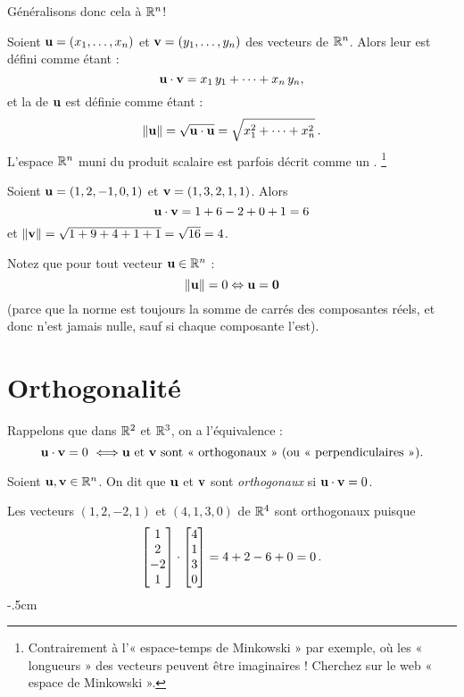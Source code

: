 Généralisons donc cela à $\mathbb{R}^n$!

\begin{definition}
Soient $\mathbf{u} = (x_1,\ldots,x_n)$ et $\mathbf{v} = (y_1,\ldots,y_n)$ des vecteurs
de $\mathbb{R}^n$.  Alors leur  est défini comme étant : 
$$
\mathbf{u} \cdot \mathbf{v} = x_1\,y_1 + \cdots + x_n\,y_n,
$$
et la  de $\mathbf{u}$ est définie comme étant :
$$
\Vert \mathbf{u} \Vert = \sqrt{\mathbf{u} \cdot \mathbf{u}} = \sqrt{x_1^2+\cdots+x_n^2}\,.
$$
L'espace $\mathbb{R}^n$  muni du produit scalaire est parfois décrit comme un .
\footnote{Contrairement à l'« espace-temps de Minkowski » par exemple, où les « longueurs » des vecteurs peuvent être imaginaires ! Cherchez sur le web « espace de Minkowski ».}
\end{definition}


\begin{myexample}
Soient $\mathbf{u} = (1,2,-1,0,1)$ et $\mathbf{v} = (1,3,2,1,1)$.  Alors
$$
\mathbf{u} \cdot \mathbf{v} = 1+6-2+0+1 = 6
$$
et
$\Vert \mathbf{v} \Vert = \sqrt{1+9+4+1+1} = \sqrt{16}=4$.
\end{myexample}

Notez que pour tout vecteur $\mathbf{u} \in \mathbb{R}^n$ :
$$
\Vert \mathbf{u} \Vert = 0 \Leftrightarrow \mathbf{u} = \mathbf{0}
$$
(parce que la norme est toujours la somme de carrés des composantes réels, et donc
n'est jamais nulle, sauf si chaque composante l'est).

\section{Orthogonalité}
\label{section : orthogonalite}

Rappelons que dans $\mathbb{R}^2$ et $\mathbb{R}^3$, on a l'équivalence :
$$
\mathbf{u} \cdot \mathbf{v} = 0 ~\Longleftrightarrow \textrm{$\mathbf{u}$ et $\mathbf{v}$ sont «~orthogonaux~» (ou «~perpendiculaires~»).}
$$

\begin{definition}
Soient $\mathbf{u},\mathbf{v} \in \mathbb{R}^n$.  On dit que $\mathbf{u}$ et $\mathbf{v}$ sont
\emph{orthogonaux} si $\mathbf{u} \cdot \mathbf{v} = 0$.
\end{definition}

\begin{myexample}
Les vecteurs $(1,2,-2,1)$ et $(4,1,3,0)$ de $\mathbb{R}^4$ sont orthogonaux puisque
$$
\left[ \begin{matrix} 1\\2\\ -2\\1 \end{matrix} \right] \cdot \left[ \begin{matrix} 4\\1\\3\\0 \end{matrix} \right] = 4+2-6+0 = 0\,.
$$
\vglue -.5cm
\end{myexample}

